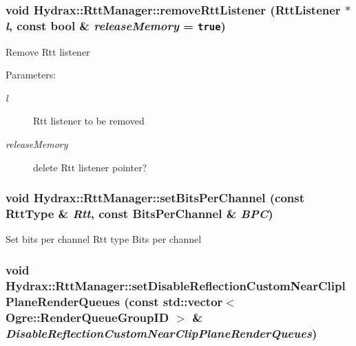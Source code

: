 \begin{CompactItemize}
{\subsubsection[{removeRttListener}]{\setlength{\rightskip}{0pt plus 5cm}void Hydrax::RttManager::removeRttListener ({\bf RttListener} $\ast$ {\em l}, \/  const bool \& {\em releaseMemory} = {\tt true})}}
\label{class_hydrax_1_1_rtt_manager_9de0d5171c46f27d34493f85e6a4f8c3}


Remove Rtt listener \begin{Desc}
\item[Parameters:]
\begin{description}
\item[{\em l}]Rtt listener to be removed \item[{\em releaseMemory}]delete Rtt listener pointer? \end{description}
\end{Desc}
\hypertarget{class_hydrax_1_1_rtt_manager_fe968a7c8f23a6fa9b0d5b499ef09491}{
\subsubsection[{setBitsPerChannel}]{\setlength{\rightskip}{0pt plus 5cm}void Hydrax::RttManager::setBitsPerChannel (const {\bf RttType} \& {\em Rtt}, \/  const {\bf BitsPerChannel} \& {\em BPC})}}
\label{class_hydrax_1_1_rtt_manager_fe968a7c8f23a6fa9b0d5b499ef09491}


Set bits per channel  Rtt type  Bits per channel \hypertarget{class_hydrax_1_1_rtt_manager_46f7b77221e50359657a4ac2f3a2365c}{
\subsubsection[{setDisableReflectionCustomNearCliplPlaneRenderQueues}]{\setlength{\rightskip}{0pt plus 5cm}void Hydrax::RttManager::setDisableReflectionCustomNearCliplPlaneRenderQueues (const std::vector$<$ Ogre::RenderQueueGroupID $>$ \& {\em DisableReflectionCustomNearClipPlaneRenderQueues})}}
\label{class_hydrax_1_1_rtt_manager_46f7b77221e50359657a4ac2f3a2365c}



\end{CompactItemize}
